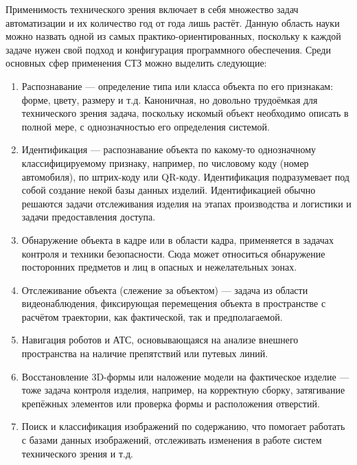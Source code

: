 Применимость технического зрения включает в себя множество задач автоматизации и их количество год от года лишь растёт. Данную область науки можно назвать одной из самых практико-ориентированных, поскольку к каждой задаче нужен свой подход и конфигурация программного обеспечения. Среди основных сфер применения СТЗ можно выделить следующие:

\begin{enumerate}
	\item Распознавание --- определение типа или класса объекта по его признакам: форме, цвету, размеру и т.д. Каноничная, но довольно трудоёмкая для технического зрения задача, поскольку искомый объект необходимо описать в полной мере, с однозначностью его определения системой.
	\item Идентификация --- распознавание объекта по какому-то однозначному классифицируемому признаку, например, по числовому коду (номер автомобиля), по штрих-коду или QR-коду. Идентификация подразумевает под собой создание некой базы данных изделий. Идентификацией обычно решаются задачи отслеживания изделия на этапах производства и логистики и задачи предоставления доступа.
	\item Обнаружение объекта в кадре или в области кадра, применяется в задачах контроля и техники безопасности. Сюда может относиться обнаружение посторонних предметов и лиц в опасных и нежелательных зонах.
	\item Отслеживание объекта (слежение за объектом) --- задача из области видеонаблюдения, фиксирующая перемещения объекта в пространстве с расчётом траектории, как фактической, так и предполагаемой.
	\item Навигация роботов и АТС, основывающаяся на анализе внешнего пространства на наличие препятствий или путевых линий. 
	\item Восстановление 3D-формы или наложение модели на фактическое изделие --- тоже задача контроля изделия, например, на корректную сборку, затягивание крепёжных элементов или проверка формы и расположения отверстий.
	\item Поиск и классификация изображений по содержанию, что помогает работать с базами данных изображений, отслеживать изменения в работе систем технического зрения и т.д.
\end{enumerate}

